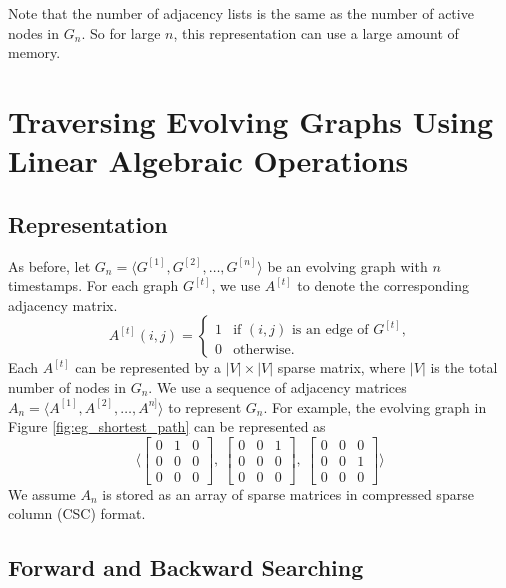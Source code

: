 \documentclass[11pt, conference, , compsocconf]{IEEEtran}
\theoremstyle{definition}
\begin{document}
Note that the number of adjacency lists is the same as the number
of active nodes in $G_n$. So for large $n$, this representation can use a large amount of memory.

\section{Traversing Evolving Graphs Using Linear Algebraic Operations}
\label{sec:evolv-graph-algor}

\subsection{Representation}
\label{sec:representation}
As before, let $G_n = \langle G^{[1]}, G^{[2]}, \ldots, G^{[n]}\rangle$ be an evolving graph with $n$ timestamps. For each graph $G^{[t]}$, we use $A^{[t]}$ to denote
the corresponding adjacency matrix.
\[
A^{[t]}(i,j) = 
\begin{cases}
 1 & \mbox{if $(i,j)$ is an edge of $G^{[t]}$,} \\
 0 & \mbox{otherwise.}
\end{cases}
\]
 Each $A^{[t]}$ can be represented by 
a $|V|\times |V|$ sparse matrix,
where $|V|$ is the total number of nodes in $G_n$.
We use a sequence of adjacency matrices $A_n = \langle A^{[1]}, A^{[2]}, \ldots, A^{n]}\rangle$ to represent $G_n$. 
For example, the evolving graph in Figure \ref{fig:eg_shortest_path}
can be represented as 
\[
\Big\langle
  \begin{bmatrix} 
    0 & 1 & 0 \\
    0 & 0 & 0 \\
    0 & 0 & 0
  \end{bmatrix},~
 \begin{bmatrix}
   0 & 0 & 1 \\
   0 & 0 & 0 \\
   0 & 0 & 0 
 \end{bmatrix},~
 \begin{bmatrix}
  0 & 0 & 0 \\
  0 & 0 & 1 \\
  0 & 0 & 0 
 \end{bmatrix}
\Big\rangle
\]
We assume $A_n$ is stored as an array of sparse matrices in compressed sparse column (CSC) format.

\subsection{Forward and Backward Searching}
\label{sec:breadth-first-search-1}
\end{document}
